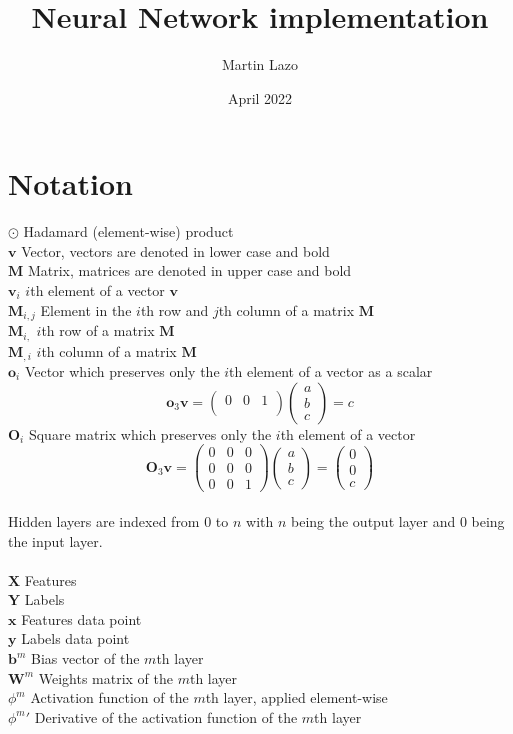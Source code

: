 \documentclass{article}
\title{Neural Network implementation}
\author{Martin Lazo}
\date{April 2022}
\begin{document}
\maketitle
\section{Notation}
\noindent
$\odot$ \tab Hadamard (element-wise) product\\
$\textbf{v}$ \tab Vector, vectors are denoted in lower case and bold\\
$\textbf{M}$ \tab Matrix, matrices are denoted in upper case and bold\\
$\textbf{v}_i$ \tab $i$th element of a vector $\textbf{v}$\\
$\textbf{M}_{i,j}$ \tab Element in the $i$th row and $j$th column of a matrix $\textbf{M}$\\
$\textbf{M}_{i,}$ \tab $i$th row of a matrix $\textbf{M}$\\
$\textbf{M}_{,i}$ \tab $i$th column of a matrix $\textbf{M}$\\
$\textbf{o}_i$ \tab Vector which preserves only the $i$th element of a vector as a scalar\\
$$
\textbf{o}_3\textbf{v}=
\begin{pmatrix}
0 & 0 & 1\\
\end{pmatrix}
\begin{pmatrix}
a\\
b\\
c
\end{pmatrix}
=
c
$$
$\textbf{O}_i$ \tab Square matrix which preserves only the $i$th element of a vector\\
$$
\textbf{O}_3\textbf{v}=
\begin{pmatrix}
0 & 0 & 0\\
0 & 0 & 0\\
0 & 0 & 1
\end{pmatrix}
\begin{pmatrix}
a\\
b\\
c
\end{pmatrix}
=
\begin{pmatrix}
0\\
0\\
c
\end{pmatrix}
$$
\\
Hidden layers are indexed from $0$ to $n$ with $n$ being the output layer and $0$ being the input layer.\\
\\
$\textbf{X}$ \tab Features\\
$\textbf{Y}$ \tab Labels\\
$\textbf{x}$ \tab Features data point\\
$\textbf{y}$ \tab Labels data point\\
$\textbf{b}^m$ \tab Bias vector of the $m$th layer\\
$\textbf{W}^m$ \tab Weights matrix of the $m$th layer\\
$\phi^m$ \tab Activation function of the $m$th layer, applied element-wise\\
${\phi^m}'$ \tab Derivative of the activation function of the $m$th layer\\
\pagebreak
\end{document}
